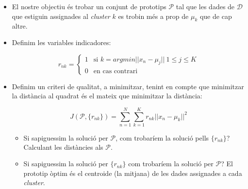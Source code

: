 \documentclass[a4paper]{article}
\begin{document}
\begin{itemize}
	\item El nostre objectiu és trobar un conjunt de prototips $\mathcal{P}$ tal que les dades de $\mathcal{D}$ que estiguin assignades al \emph{cluster} $k$ es trobin més a prop de $\mu_k$ que de cap altre.
	\item Definim les variables indicadores:
	
	$$ r_{nk} =
	\begin{cases}
	1 & \text{si } k = argmin ||x_n - \mu_j||\ 1 \le j \le K \\ 0 & \text{en cas contrari}
	\end{cases}$$
	
	\item Definim un criteri de qualitat, a minimitzar, tenint en compte que minimitzar la distància al quadrat és el mateix que minimitzar la distància:
	
	$$ J(\mathcal{P}, \{r_{nk}\}) = \sum_{n=1}^N \sum_{k=1}^K r_{nk} ||x_n - \mu_k||^2 $$
	
	\begin{itemize}
		\item Si sapiguessim la solució per $\mathcal{P}$, com trobaríem la solució pells $\{r_{nk}\}$? Calculant les distàncies als $\mathcal{P}$.
		
		\item Si sapiguessim la solució per $\{r_{nk}\}$ com trobaríem la solució per $\mathcal{P}$? El prototip òptim és el centroide (la mitjana) de les dades assignades a cada \emph{cluster}.
	\end{itemize}
\end{itemize}
\end{document}
